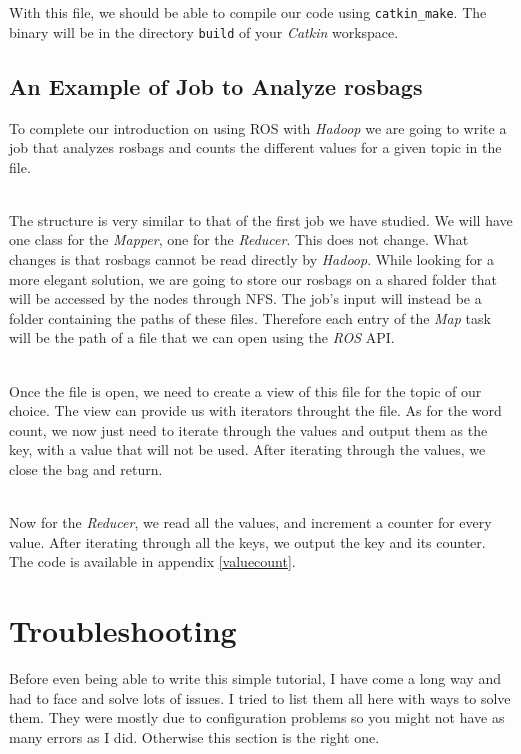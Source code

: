 \documentclass[a4paper, 12pt]{article}
\begin{document}
With this file, we should be able to compile our code using \texttt{catkin\_make}. The binary will be in the directory \texttt{build} of your \textit{Catkin} workspace.

  \subsection{An Example of Job to Analyze rosbags}

To complete our introduction on using ROS with \textit{Hadoop} we are going to write a job that analyzes rosbags and counts the different values for a given topic in the file.

~\\
The structure is very similar to that of the first job we have studied. We will have one class for the \textit{Mapper}, one for the \textit{Reducer}. This does not change. What changes is that rosbags cannot be read directly by \textit{Hadoop}. While looking for a more elegant solution, we are going to store our rosbags on a shared folder that will be accessed by the nodes through NFS. The job's input will instead be a folder containing the paths of these files. Therefore each entry of the \textit{Map} task will be the path of a file that we can open using the \textit{ROS} API.

~\\
Once the file is open, we need to create a view of this file for the topic of our choice. The view can provide us with iterators throught the file. As for the word count, we now just need to iterate through the values and output them as the key, with a value that will not be used. After iterating through the values, we close the bag and return.

~\\
Now for the \textit{Reducer}, we read all the values, and increment a counter for every value. After iterating through all the keys, we output the key and its counter. The code is available in appendix \ref{valuecount}.

\section{Troubleshooting}

Before even being able to write this simple tutorial, I have come a long way and had to face and solve lots of issues. I tried to list them all here with ways to solve them. They were mostly due to configuration problems so you might not have as many errors as I did. Otherwise this section is the right one.
\end{document}

